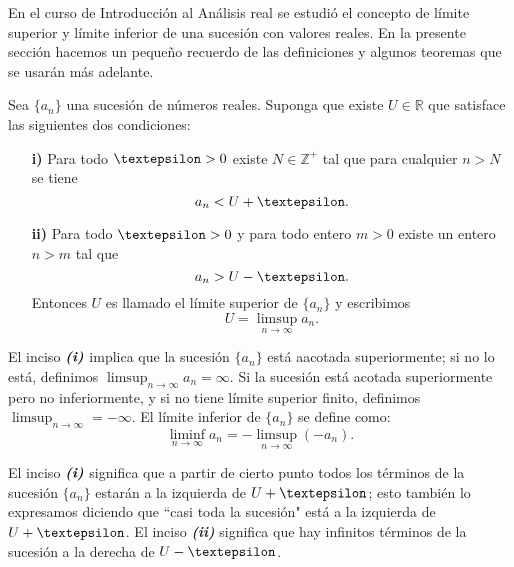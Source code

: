 En el curso de Introducción al Análisis real se estudió el concepto de límite superior y límite inferior de una sucesión con valores reales. En la presente sección hacemos un pequeño recuerdo de las definiciones y algunos teoremas que se usarán más adelante.

\begin{definition}
  Sea $\lbrace{a_n\rbrace}$ una sucesión de números reales. Suponga que existe $U\in\mathbb{R}$ que satisface las siguientes dos condiciones:
  \begin{itemize}
    \item[\textbf{i)}] Para todo $\text{\textepsilon}>0$ existe $N\in\mathbb{Z}^+$ tal que para cualquier $n>N$ se tiene
    \begin{equation*}
      a_n<U+\text{\textepsilon}.
    \end{equation*}
    \item[\textbf{ii)}]Para todo $\text{\textepsilon}>0$ y para todo entero $m>0$ existe un entero $n>m$ tal que
    \begin{equation*}
      a_n>U-\text{\textepsilon}.
    \end{equation*}
    Entonces $U$ es llamado el límite superior de $\lbrace{a_n\rbrace}$ y escribimos
    \begin{equation*}
      U=\limsup_{n\to\infty}a_n.
    \end{equation*}
  \end{itemize}
  El inciso $\textit{\textbf{(i)}}$ implica que la sucesión $\lbrace{a_n\rbrace}$ está aacotada superiormente; si no lo está, definimos $\limsup_{n\to\infty}a_n=\infty$. Si la sucesión está acotada superiormente pero no inferiormente, y si no tiene límite superior finito, definimos $\limsup_{n\to\infty}=-\infty$. El límite inferior de $\lbrace{a_n\rbrace}$ se define como:
  \begin{equation*}
    \liminf_{n\to\infty}a_n=-\limsup_{n\to\infty}(-a_n).
  \end{equation*}
\end{definition}
\begin{remark}
  El inciso $\textit{\textbf{(i)}}$ significa que a partir de cierto punto todos los términos de la sucesión $\lbrace{a_n\rbrace}$ estarán a la izquierda de $U+\text{\textepsilon}$; esto también lo expresamos diciendo que ``casi toda la sucesión" está a la izquierda de $U+\text{\textepsilon}$. El inciso \textit{\textbf{(ii)}} significa que hay infinitos términos de la sucesión a la derecha de $U-\text{\textepsilon}$.
\end{remark}
